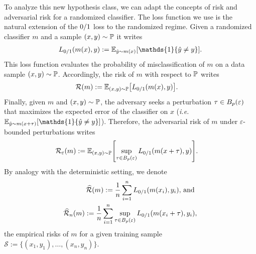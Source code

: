 To analyze this new hypothesis class, we can adapt the concepts of risk and adversarial risk for a randomized classifier. The loss function we use is the natural extension of the $0/1$ loss to the randomized regime. Given a randomized classifier $m $ and a sample $(x ,y) \sim \mathbb{P}$ it writes
\begin{align}
    \zerooneloss(m (x ),y) := \mathbb{E}_{\hat{y} \sim m (x )}  \left[ \mathds{1} \left\{\hat{y} \neq y\right\}\right] .
\end{align}
This loss function evaluates the probability of misclassification of $m $ on a data sample $(x ,y) \sim \mathbb{P}$. Accordingly, the risk of $m $ with respect to $\mathbb{P}$ writes
\begin{align}
\risk(m ) &:=  \mathbb{E}_{(x ,y)\sim \PP}\left[ \zerooneloss(m ( x ),y)   \right].
\end{align}
Finally, given $m $ and $(x ,y) \sim \mathbb{P}$, the adversary seeks a perturbation ${\tau} \in  B_p(\varepsilon)$ that maximizes the expected error of the classifier on $x $ (\emph{i.e.} $\mathbb{E}_{\hat{y} \sim m (x  + \perturb)}  \left[ \mathds{1} \left\{\hat{y} \neq y\right\}\right]$). Therefore, the adversarial risk of $m $ under $\varepsilon$-bounded perturbations writes
\begin{align}
\risk_\varepsilon(m) &:= \mathbb{E}_{(x ,y)\sim \PP}\left[ \sup_{  \perturb \in B_p(\varepsilon)} \zerooneloss(m (x  + \perturb),y)  \right].
\end{align}
By analogy with the deterministic setting, we denote 
\begin{align}
    \widehat{\risk}\left( m  \right) := \frac1n\sum_{i=1}^n \zerooneloss \left(m (x _i), y_i\right) \text{, and } \\
    \widehat{\risk}_\numsamples \left( m  \right):= \frac1n\sum_{i=1}^n \sup_{\perturb \in B_p(\varepsilon)}\zerooneloss \left(m ({x_i} + \perturb), y_i\right),
\end{align} the empirical risks of $m $ for a given training sample $\mathcal{S}:=\{ ({x_1},y_1), \dots , ({x_n},y_n) \}$.


